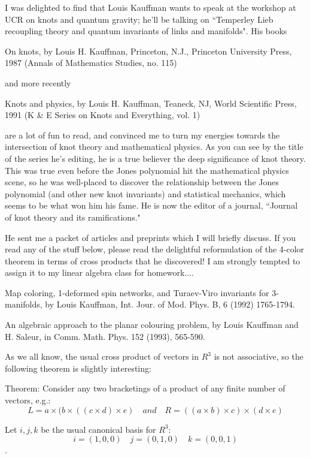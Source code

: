 I was delighted to find that Louis Kauffman wants to speak at the workshop at UCR on knots and quantum gravity; he'll be talking on ``Temperley Lieb recoupling theory and quantum invariants of links and manifolds". His books

On knots, by Louis H. Kauffman, Princeton, N.J., Princeton University Press, 1987 (Annals of Mathematics Studies, no. 115)

and more recently

Knots and physics, by Louis H. Kauffman, Teaneck, NJ, World Scientific Press, 1991 (K & E Series on Knots and Everything, vol. 1)

are a lot of fun to read, and convinced me to turn my energies towards the intersection of knot theory and mathematical physics. As you can see by the title of the series he's editing, he is a true believer the deep significance of knot theory. This was true even before the Jones polynomial hit the mathematical physics scene, so he was well-placed to discover the relationship between the Jones polynomial (and other new knot invariants) and statistical mechanics, which seems to be what won him his fame. He is now the editor of a journal, ``Journal of knot theory and its ramifications."

He sent me a packet of articles and preprints which I will briefly discuss. If you read any of the stuff below, please read the delightful reformulation of the 4-color theorem in terms of cross products that he discovered! I am strongly tempted to assign it to my linear algebra class for homework....


Map coloring, 1-deformed spin networks, and Turaev-Viro invariants for 3-manifolds, by Louis Kauffman, Int. Jour. of Mod. Phys. B, 6 (1992) 1765-1794.

An algebraic approach to the planar colouring problem, by Louis Kauffman and H. Saleur, in Comm. Math. Phys. 152 (1993), 565-590.

As we all know, the usual cross product of vectors in $R^3$ is not associative, so the following theorem is slightly interesting:

Theorem: Consider any two bracketings of a product of any finite number of vectors, e.g.: 
\[L = a \times (b \times ((c \times d) \times e)  \quad and \quad  R = ((a \times b) \times c) \times (d \times e)\]

Let $i,j,k$ be the usual canonical basis for $R^3$:
\[i = (1,0,0) \quad j = (0,1,0) \quad k = (0,0,1)\].

